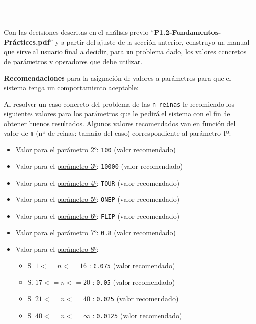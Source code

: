 \newpage
\begin{center}
	{\fboxrule=4pt } \\
	\setcounter{chapter}{4}
	\setcounter{section}{0}
	\rule{15cm}{0pt} \\
\end{center}

\par Con las decisiones descritas en el análisis previo ``\textbf{P1.2-Fundamentos-Prácticos.pdf}''
y a partir del ajuste de la sección anterior, construyo un manual que sirve al usuario final a decidir, para
un problema dado, los valores concretos de parámetros y operadores que debe utilizar.

\par \textbf{Recomendaciones} para la asignación de valores a parámetros para que el sistema tenga un 
comportamiento aceptable:
\par Al resolver un caso concreto del problema de las \texttt{n-reinas} le recomiendo los 
siguientes valores para los parámetros que le pedirá el sistema con el fin de obtener buenos resultados.
Algunos valores recomendados van en función del valor de \texttt{n} (nº de reinas: tamaño del caso)
correspondiente al parámetro 1º:
\begin{itemize}
	\item Valor para el \underline{parámetro 2º}: \texttt{100} (valor recomendado)
 	\item Valor para el \underline{parámetro 3º}: \texttt{10000} (valor recomendado)
  	\item Valor para el \underline{parámetro 4º}: \texttt{TOUR} (valor recomendado)
  	\item Valor para el \underline{parámetro 5º}: \texttt{ONEP} (valor recomendado)
  	\item Valor para el \underline{parámetro 6º}: \texttt{FLIP} (valor recomendado)
  	\item Valor para el \underline{parámetro 7º}: \texttt{0.8} (valor recomendado)
  	\item Valor para el \underline{parámetro 8º}: 
	\begin{itemize}
    	\item Si $1 <= n <= 16$ : \texttt{0.075} (valor recomendado)
     	\item Si $17 <= n <= 20$ : \texttt{0.05} (valor recomendado)
      	\item Si $21 <= n <= 40$ : \texttt{0.025} (valor recomendado)
  		\item Si $40 <= n <= \infty$ : \texttt{0.0125} (valor recomendado)
   	\end{itemize}
\end{itemize}